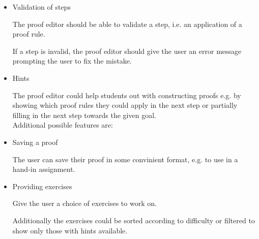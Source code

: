 \begin{itemize}
    \item Validation of steps

%
The proof editor should be able to validate a step, i.e. an application of a proof rule. 
%

%
If a step is invalid, the proof editor should give the user an error message prompting the user to fix the mistake.
%


%
\item Hints

%
The proof editor could help students out with constructing proofs e.g. by showing which proof rules they could apply in the next step or partially filling in the next step towards the given goal. \\


%
Additional possible features are:

%
\item Saving a proof

%
The user can save their proof in some convinient format, e.g. to use in a hand-in assignment.
%

%
\item Providing exercises

%
Give the user a choice of exercises to work on. 

%
Additionally the exercises could be sorted according to difficulty or filtered to show only those with hints available.
%
\end{itemize}